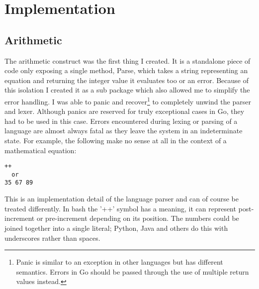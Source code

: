\chapter{Implementation}




\section{Arithmetic}
The arithmetic construct was the first thing I created.
It is a standalone piece of code only exposing a single method, Parse, which takes a string representing an equation and returning the integer value it evaluates too or an error.
Because of this isolation I created it as a sub package which also allowed me to simplify the error handling.
I was able to panic and recover\footnote{Panic is similar to an exception in other languages but has different semantics. Errors in Go should be passed through the use of multiple return values instead.} to completely unwind the parser and lexer.
Although panics are reserved for truly exceptional cases in Go, they had to be used in this case.
Errors encountered during lexing or parsing of a language are almost always fatal as they leave the system in an indeterminate state.
For example, the following make no sense at all in the context of a mathematical equation:
\begin{verbatim}
++
  or
35 67 89
\end{verbatim}
This is an implementation detail of the language parser and can of course be treated differently.
In bash the '++' symbol has a meaning, it can represent post-increment or pre-increment depending on its position.
The numbers could be joined together into a single literal; Python, Java and others do this with underscores rather than spaces\cite{UNDERSCORE-NUM-LITERAL}.

